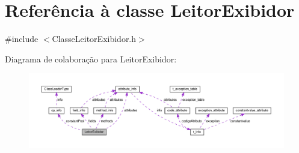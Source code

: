 \hypertarget{classLeitorExibidor}{}\section{Referência à classe Leitor\+Exibidor}
\label{classLeitorExibidor}


{\ttfamily \#include $<$Classe\+Leitor\+Exibidor.\+h$>$}



Diagrama de colaboração para Leitor\+Exibidor\+:
\nopagebreak
\begin{figure}[H]
\begin{center}
\leavevmode
\includegraphics[width=350pt]{classLeitorExibidor__coll__graph}
\end{center}
\end{figure}
